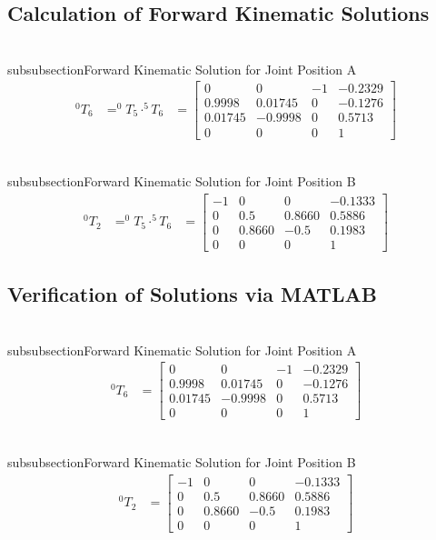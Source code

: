 \documentclass[fleqn]{article}
\begin{document}
\subsection{Calculation of Forward Kinematic Solutions}
\\subsubsection{Forward Kinematic Solution for Joint Position A}
\begin{equation}
\begin{split}
^{0}T_{6}&=^{0}T_{5}\cdot^{5}T_{6}
&=\begin{bmatrix}
0 & 0 & -1 & -0.2329\\
0.9998 & 0.01745 & 0 & -0.1276\\
0.01745 & -0.9998 & 0 & 0.5713\\
0 & 0 & 0 & 1
\end{bmatrix}
\end{split}
\end{equation}

\\subsubsection{Forward Kinematic Solution for Joint Position B}
\begin{equation}
\begin{split}
^{0}T_{2}&=^{0}T_{5}\cdot^{5}T_{6}
&=\begin{bmatrix}
-1 & 0 & 0 & -0.1333\\
0 & 0.5 & 0.8660 & 0.5886\\
0 & 0.8660 & -0.5 & 0.1983\\
0 & 0 & 0 & 1
\end{bmatrix}
\end{split}
\end{equation}

\subsection{Verification of Solutions via MATLAB}
\\subsubsection{Forward Kinematic Solution for Joint Position A}
\begin{equation}
\begin{split}
^{0}T_{6}&=\begin{bmatrix}
0 & 0 & -1 & -0.2329\\
0.9998 & 0.01745 & 0 & -0.1276\\
0.01745 & -0.9998 & 0 & 0.5713\\
0 & 0 & 0 & 1
\end{bmatrix}
\end{split}
\end{equation}

\\subsubsection{Forward Kinematic Solution for Joint Position B}
\begin{equation}
\begin{split}
^{0}T_{2}&=\begin{bmatrix}
-1 & 0 & 0 & -0.1333\\
0 & 0.5 & 0.8660 & 0.5886\\
0 & 0.8660 & -0.5 & 0.1983\\
0 & 0 & 0 & 1
\end{bmatrix}
\end{split}
\end{equation}
\end{document}
